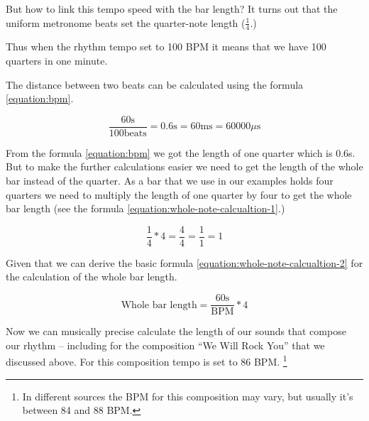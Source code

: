 \documentclass[../sparc.tex]{subfiles}
\begin{document}
But how to link this tempo speed with the bar length?  It turns out that the
uniform metronome beats set the quarter-note length ($\frac{1}{4}$.)

Thus when the rhythm tempo set to 100 BPM it means that we have 100 quarters in
one minute.


The distance between two beats can be calculated using the formula
\ref{equation:bpm}.

\begin{equation}
  \frac{60 \mbox{s}}{100 \mbox{beats}} = 0.6 \mbox{s} = 60 \mbox{ms} = 60000 \mu\mbox{s}
  \label{equation:bpm}
\end{equation}

From the formula \ref{equation:bpm} we got the length of one quarter which is
0.6s.  But to make the further calculations easier we need to get the length of
the whole bar instead of the quarter.  As a bar that we use in our examples
holds four quarters we need to multiply the length of one quarter by four to get
the whole bar length (see the formula \ref{equation:whole-note-calcualtion-1}.)

\begin{equation}
  \frac{1}{4} * 4 = \frac{4}{4} = \frac{1}{1} = 1
  \label{equation:whole-note-calcualtion-1}
\end{equation}

Given that we can derive the basic formula
\ref{equation:whole-note-calcualtion-2} for the calculation of the whole bar
length.

\begin{equation}
  \mbox{Whole bar length} = \frac{60 \mbox{s}}{\mbox{BPM}} * 4
  \label{equation:whole-note-calcualtion-2}
\end{equation}

Now we can musically precise calculate the length of our sounds that compose our
rhythm -- including for the composition ``We Will Rock You'' that we discussed
above.  For this composition tempo is set to 86 BPM. \footnote{In different
sources the BPM for this composition may vary, but usually it's between 84 and
88 BPM.}
\end{document}

